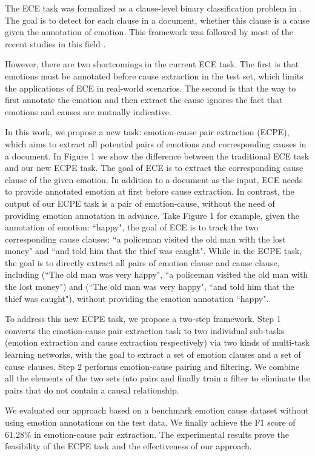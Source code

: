 \documentclass[11pt,a4paper]{article}
\begin{document}
The ECE task was formalized as a clause-level binary classification problem in \citet{gui2016event}. The goal is to detect for each clause in a document, whether this clause is a cause given the annotation of emotion. This framework was followed by most of the recent studies in this field \cite{lee2010text,gui2016event,li2018co,xu2019extracting,yu2019multiple}.

However, there are two shortcomings in the current ECE task. The first is that emotions must be annotated before cause extraction in the test set, which limits the applications of ECE in real-world scenarios. The second is that the way to first annotate the emotion and then extract the cause ignores the fact that emotions and causes are mutually indicative.

In this work, we propose a new task: emotion-cause pair extraction (ECPE), which aims to extract all potential pairs of emotions and corresponding causes in a document. In Figure 1 we show the difference between the traditional ECE task and our new ECPE task. The goal of ECE is to extract the corresponding cause clause of the given emotion. In addition to a document as the input, ECE needs to provide annotated emotion at first before cause extraction. In contrast, the output of our ECPE task is a pair of emotion-cause, without the need of providing emotion annotation in advance. Take Figure 1 for example, given the annotation of emotion: ``happy", the goal of ECE is to track the two corresponding cause clauses: ``a policeman visited the old man with the lost money" and ``and told him that the thief was caught". While in the ECPE task, the goal is to directly extract all pairs of emotion clause and cause clause, including (``The old man was very happy", ``a policeman visited the old man with the lost money") and (``The old man was very happy", ``and told him that the thief was caught"), without providing the emotion annotation ``happy".


To address this new ECPE task, we propose a two-step framework. Step 1 converts the emotion-cause pair extraction task to two individual sub-tasks (emotion extraction and cause extraction respectively) via two kinds of multi-task learning networks, with the goal to extract a set of emotion clauses and a set of cause clauses. Step 2 performs emotion-cause pairing and filtering. We combine all the elements of the two sets into pairs and finally train a filter to eliminate the pairs that do not contain a causal relationship.

We evaluated our approach based on a benchmark emotion cause dataset \cite{gui2016event} without using emotion annotations on the test data. We finally achieve the F1 score of 61.28\% in emotion-cause pair extraction.  The experimental results prove the feasibility of the ECPE task and the effectiveness of our approach.
\end{document}
